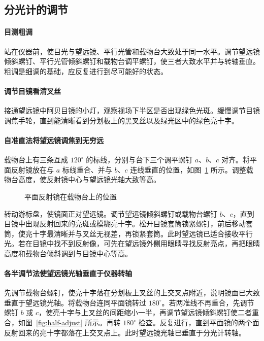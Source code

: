 \documentclass{../template/myrpt}
\begin{document}
\subsection{分光计的调节}

\paragraph{目测粗调}
站在仪器前，使目光与望远镜、平行光管和载物台大致处于同一水平。调节望远镜倾斜螺钉、平行光管倾斜螺钉和载物台调平螺钉，使三者大致水平并与转轴垂直。粗调是细调的基础，应反复进行到尽可能好的状态。

\paragraph{调节目镜看清叉丝}
接通望远镜中阿贝目镜的小灯，观察视场下半区是否出现绿色光斑。缓慢调节目镜调焦手轮，直到能清晰看到分划板上的黑叉丝以及绿光区中的绿色亮十字。

\paragraph{自准直法将望远镜调焦到无穷远}
载物台上有三条互成 $120^\circ$ 的标线，分别与台下三个调平螺钉 $a$、$b$、$c$ 对齐。将平面反射镜放在与 $a$ 标线重合、并与 $b$、$c$ 连线垂直的位置，如图~\ref{fig:mirror-placement} 所示。调整载物台高度，使反射镜中心与望远镜光轴大致等高。

\begin{figure}[!htbp]
  \centering
  
  \caption{平面反射镜在载物台上的位置}
  \label{fig:mirror-placement}
\end{figure}

转动游标盘，使镜面正对望远镜。调节望远镜倾斜螺钉或载物台螺钉 $b$、$c$，直到目镜中出现反射回来的亮斑或模糊亮十字。松开目镜套筒锁紧螺钉，前后移动套筒，使亮十字最清晰并与叉丝无视差，再锁紧套筒。此时望远镜已适合接收平行光。若在目镜中找不到反射像，可先在望远镜外侧用眼睛寻找反射亮点，再把眼睛高度和载物台倾斜调到与目镜中心等高。

\paragraph{各半调节法使望远镜光轴垂直于仪器转轴}
先调节载物台螺钉，使亮十字落在分划板上叉丝的上交叉点附近，说明镜面已大致垂直于望远镜光轴。将载物台连同平面镜转过 $180^\circ$。若两准线不再重合，先调节螺钉 $b$ 或 $c$，使亮十字与上叉丝的间距缩小一半，再调节望远镜倾斜螺钉使二者重合，如图~\ref{fig:half-adjust} 所示。再转 $180^\circ$ 检查。反复进行，直到平面镜的两个面反射回来的亮十字都落在上交叉点上。此时望远镜光轴已垂直于分光计转轴。
\end{document}

